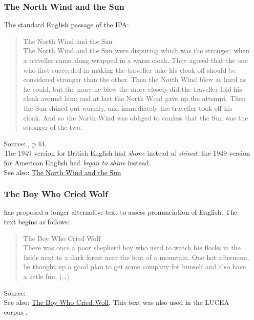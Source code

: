 \documentclass[
]{book}
\begin{document}
\subsubsection{The North Wind and the Sun}\label{the-north-wind-and-the-sun}

The standard English passage of the IPA:

\begin{quote}
The North Wind and the Sun\\
The North Wind and the Sun were disputing which was the stronger, when a traveller came along wrapped in a
warm cloak. They agreed that the one who first succeeded in making the traveller take his cloak off should be considered stronger than the other. Then the North Wind blew as hard as he could, but the more he blew the more closely did the traveller fold his cloak around him; and at last the North Wind gave up the attempt. Then the Sun shined out warmly, and immediately the traveller took off his cloak. And so the North Wind was obliged to confess that the Sun was the stronger of the two.
\end{quote}

Source: \citet{HandbookIPA_1999}, p.44.\\
The 1949 version for British English had \emph{shone} instead of \emph{shined}; the 1949 version for American English had \emph{began to shine} instead.\\
See also: \href{https://en.wikipedia.org/wiki/The_North_Wind_and_the_Sun}{The North Wind and the Sun}

\subsubsection{The Boy Who Cried Wolf}\label{the-boy-who-cried-wolf}

\citet{Deterding_2006} has proposed a longer alternative text to assess pronunciation of English. The text begins as follows:

\begin{quote}
The Boy Who Cried Wolf\\
There was once a poor shepherd boy who used to watch his flocks in the fields next to a dark forest near the foot of a mountain. One hot afternoon, he thought up a good plan to get some company for himself and also have a little fun. (\ldots)
\end{quote}

Source: \citet{Deterding_2006}\\
See also: \href{https://en.wikipedia.org/wiki/The_Boy_Who_Cried_Wolf}{The Boy Who Cried Wolf}. This text was also used in the LUCEA corpus \citep{Orr_Quené_2017}.
\end{document}
